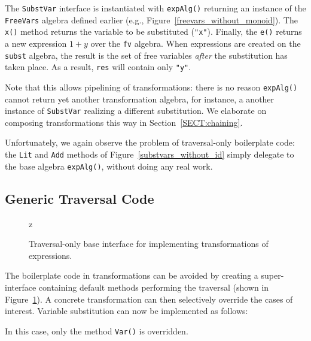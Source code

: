 The \lstinline{SubstVar} interface is instantiated with \lstinline{expAlg()} returning an instance of the \lstinline{FreeVars} algebra defined earlier (e.g., Figure~\ref{freevars_without_monoid}). The \lstinline{x()} method returns the variable to be substituted (\lstinline{"x"}). Finally, the \lstinline{e()} returns a new expression $1+y$ over the \lstinline{fv} algebra.
When expressions are created on the \lstinline{subst} algebra, the result is the set of free variables \textit{after} the substitution has taken place. As a result, \lstinline{res} will contain only \lstinline{"y"}.

Note that this allows pipelining of transformations: there is no reason
\lstinline{expAlg()} cannot return yet another transformation
algebra, for instance, a another instance of \lstinline{SubstVar} realizing a different substitution. We elaborate on composing transformations this way in Section~\ref{SECT:chaining}.


Unfortunately, we again observe the problem of traversal-only boilerplate code: the
\lstinline{Lit} and \lstinline{Add} methods of Figure~\ref{substvars_without_id} simply delegate to the
base algebra \lstinline{expAlg()}, without doing any real work.

\subsection{Generic Traversal Code}

\begin{figure}[t]
\nocaptionrule
\caption{Traversal-only base interface for implementing transformations of expressions.}z
\label{generic_transform}
\end{figure}

The boilerplate code in transformations can be avoided by creating a
super-interface containing default methods performing the traversal
(shown in Figure~\ref{generic_transform}). A concrete transformation can
then selectively override the cases of interest. Variable substitution
can now be implemented as follows:


\noindent In
this case, only the method \lstinline{Var()} is overridden.


